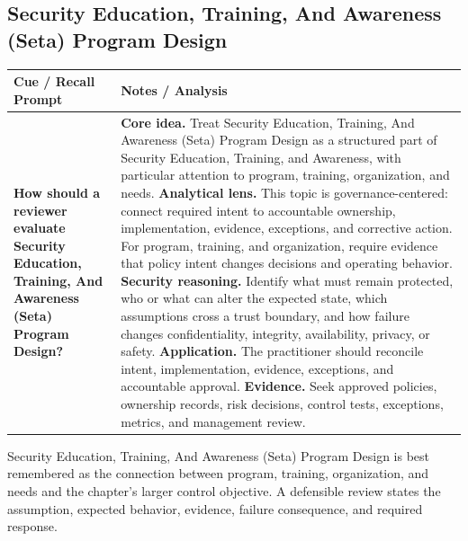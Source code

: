 \documentclass[11pt]{article}
\newcommand{\CornellHeader}{%
\rowcolor{Navy}\color{white}\bfseries Cue / Recall Prompt & \color{white}\bfseries Notes / Analysis\\\hline}
\newcommand{\CornellRow}[2]{%
\cellcolor{CueGray}\RaggedRight\textbf{#1} & \RaggedRight #2\\\hline}
\begin{document}
\subsection*{Security Education, Training, And Awareness (Seta) Program Design}
\begin{longtable}{>{\RaggedRight\arraybackslash}p{}|>{\RaggedRight\arraybackslash}p{}}
\CornellHeader
\CornellRow{How should a reviewer evaluate Security Education, Training, And Awareness (Seta) Program Design?}{\textbf{Core idea.} Treat Security Education, Training, And Awareness (Seta) Program Design as a structured part of Security Education, Training, and Awareness, with particular attention to program, training, organization, and needs. \textbf{Analytical lens.} This topic is governance-centered: connect required intent to accountable ownership, implementation, evidence, exceptions, and corrective action. For program, training, and organization, require evidence that policy intent changes decisions and operating behavior. \textbf{Security reasoning.} Identify what must remain protected, who or what can alter the expected state, which assumptions cross a trust boundary, and how failure changes confidentiality, integrity, availability, privacy, or safety. \textbf{Application.} The practitioner should reconcile intent, implementation, evidence, exceptions, and accountable approval. \textbf{Evidence.} Seek approved policies, ownership records, risk decisions, control tests, exceptions, metrics, and management review.}
\end{longtable}
\begin{topicsummary}
Security Education, Training, And Awareness (Seta) Program Design is best remembered as the connection between program, training, organization, and needs and the chapter's larger control objective. A defensible review states the assumption, expected behavior, evidence, failure consequence, and required response.
\end{topicsummary}
\end{document}
